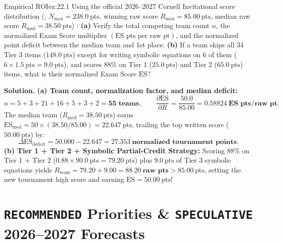 \begin{workedexample}{Empirical ROI}{ex:22.1}
Using the official 2026--2027 Cornell Invitational score distribution (, $N_{\mathrm{max}} = \SI{238.0}{\text{pts}}$, winning raw score $R_{\max} = \SI{85.00}{\text{pts}}$, median raw score $R_{\mathrm{med}} = \SI{38.50}{\text{pts}}$) :
\textbf{(a)} Verify the total competing team count $n$, the normalized Exam Score multiplier $(\text{ES pts per raw pt})$, and the normalized point deficit between the median team and 1st place.
\textbf{(b)} If a team skips all 34 Tier 3 items ($\SI{148.0}{\text{pts}}$) except for writing symbolic equations on 6 of them ($6 \times \SI{1.5}{\text{pts}} = \SI{9.0}{\text{pts}}$), and scores $88\%$ on Tier 1 ($\SI{25.0}{\text{pts}}$) and Tier 2 ($\SI{65.0}{\text{pts}}$) items, what is their normalized Exam Score $\mathrm{ES}$?

\textbf{Solution.}
\textbf{(a) Team count, normalization factor, and median deficit:}
\[
  n = 5 + 3 + 21 + 16 + 5 + 3 + 2 = \mathbf{55\text{ teams}}, \qquad
  \frac{\partial \mathrm{ES}}{\partial R} = \frac{50.0}{85.00} = \mathbf{\SI{0.58824}{\text{ES pts/raw pt}}}.
\]
The median team ($R_{\mathrm{med}} = \SI{38.50}{\text{pts}}$) earns $\mathrm{ES}_{\mathrm{med}} = 50 \times (38.50 / 85.00) = \SI{22.647}{\text{pts}}$, trailing the top written score ($\SI{50.00}{\text{pts}}$) by:
\[
  \Delta\mathrm{ES}_{\mathrm{deficit}} = 50.000 - 22.647 = \mathbf{\SI{27.353}{\text{normalized tournament points}}}.
\]
\textbf{(b) Tier 1 + Tier 2 + Symbolic Partial-Credit Strategy:}
Scoring $88\%$ on Tier 1 + Tier 2 ($0.88 \times \SI{90.0}{\text{pts}} = \SI{79.20}{\text{pts}}$) plus $\SI{9.0}{\text{pts}}$ of Tier 3 symbolic equations yields $R_{\mathrm{team}} = 79.20 + 9.00 = \mathbf{\SI{88.20}{\text{raw pts}}} > \SI{85.00}{\text{pts}}$, setting the new tournament high score and earning \textbf{$\mathrm{ES} = \SI{50.00}{\text{pts}}$}!
\end{workedexample}

\section{\texttt{RECOMMENDED} Priorities \& \texttt{SPECULATIVE} 2026--2027 Forecasts}\label{sec:22.3}

